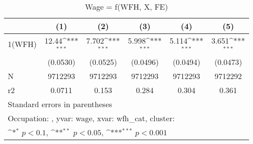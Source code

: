\begin{table}[htbp]\centering
\def\sym#1{\ifmmode^{#1}\else\(^{#1}\)\fi}
\caption{Wage = f(WFH, X, FE)}
\begin{tabular}{l*{5}{c}}
\hline\hline
                    &\multicolumn{1}{c}{(1)}         &\multicolumn{1}{c}{(2)}         &\multicolumn{1}{c}{(3)}         &\multicolumn{1}{c}{(4)}         &\multicolumn{1}{c}{(5)}         \\
\hline
1(WFH)              &       12.44\sym{***}&       7.702\sym{***}&       5.998\sym{***}&       5.114\sym{***}&       3.651\sym{***}\\
                    &    (0.0530)         &    (0.0525)         &    (0.0496)         &    (0.0494)         &    (0.0473)         \\
\hline
N                   &     9712293         &     9712293         &     9712293         &     9712293         &     9712292         \\
r2                  &      0.0711         &       0.153         &       0.284         &       0.304         &       0.361         \\
\hline\hline
\multicolumn{6}{l}{\footnotesize Standard errors in parentheses}\\
\multicolumn{6}{l}{\footnotesize Occupation: , yvar: wage, xvar: wfh\_cat, cluster: }\\
\multicolumn{6}{l}{\footnotesize \sym{*} \(p<0.1\), \sym{**} \(p<0.05\), \sym{***} \(p<0.001\)}\\
\end{tabular}
\end{table}
